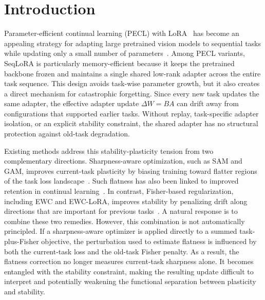 \section{Introduction}
\label{sec:intro}

Parameter-efficient continual learning (PECL) with LoRA~\citep{hu2022lora} has become an appealing strategy for adapting large pretrained vision models to sequential tasks while updating only a small number of parameters~\citep{Wang_2022_CVPR,Gao_2023_ICCV,Smith2023CODA}.
Among PECL variants, SeqLoRA is particularly memory-efficient because it keeps the pretrained backbone frozen and maintains a single shared low-rank adapter across the entire task sequence.
This design avoids task-wise parameter growth, but it also creates a direct mechanism for catastrophic forgetting.
Since every new task updates the same adapter, the effective adapter update $\Delta W=BA$ can drift away from configurations that supported earlier tasks.
Without replay, task-specific adapter isolation, or an explicit stability constraint, the shared adapter has no structural protection against old-task degradation.

Existing methods address this stability-plasticity tension from two complementary directions.
Sharpness-aware optimization, such as SAM and GAM, improves current-task plasticity by biasing training toward flatter regions of the task loss landscape~\citep{foretSharpnessAwareMinimizationEfficiently2021,zhengGradientAwareminimizationDistributed2021}.
Such flatness has also been linked to improved retention in continual learning~\citep{NEURIPS2020_518a38cc,shiOvercomingCatastrophicForgetting2021}.
In contrast, Fisher-based regularization, including EWC and EWC-LoRA, improves stability by penalizing drift along directions that are important for previous tasks~\citep{EWC2017,zheng2025ewclora}.
A natural response is to combine these two remedies.
However, this combination is not automatically principled.
If a sharpness-aware optimizer is applied directly to a summed task-plus-Fisher objective, the perturbation used to estimate flatness is influenced by both the current-task loss and the old-task Fisher penalty.
As a result, the flatness correction no longer measures current-task sharpness alone.
It becomes entangled with the stability constraint, making the resulting update difficult to interpret and potentially weakening the functional separation between plasticity and stability.

